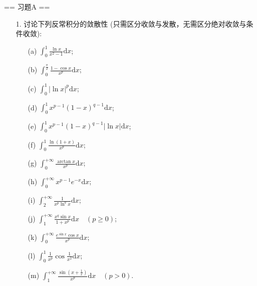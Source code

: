 \newenvironment{solution}{\begin{proofc}[解答]}{\end{proofc}}

== 习题A ==

\begin{enumerate}
    \item[1.]讨论下列反常积分的敛散性 (只需区分收敛与发散，无需区分绝对收敛与条件收敛):
    \begin{enumerate}
        \item[(a)]$\displaystyle \int_{0}^{1}\frac{\ln{x}}{x^2-1}\mathrm{d}x$;
        \item[(b)]$\displaystyle \int_{0}^{\frac{\pi}{2}}\frac{1-\cos{x}}{x^p}\mathrm{d}x$;
        \item[(c)]$\displaystyle \int_{0}^{1}\left|\ln{x}\right|^p\mathrm{d}x$;
        \item[(d)]$\displaystyle \int_{0}^{1}x^{p-1}(1-x)^{q-1}\mathrm{d}x$;
        \item[(e)]$\displaystyle \int_{0}^{1}x^{p-1}(1-x)^{q-1}\left|\ln{x}\right|\mathrm{d}x$;
        \item[(f)]$\displaystyle \int_{0}^{1}\frac{\ln(1+x)}{x^p}\mathrm{d}x$;
        \item[(g)]$\displaystyle \int_{0}^{+\infty}\frac{\arctan{x}}{x^p}\mathrm{d}x$;
        \item[(h)]$\displaystyle \int_{0}^{+\infty}x^{p-1}e^{-x}\mathrm{d}x$;
        \item[(i)]$\displaystyle \int_{2}^{+\infty}\frac{1}{x^p\ln^q{x}}\mathrm{d}x$;
        \item[(j)]$\displaystyle \int_{1}^{+\infty}\frac{x^q\sin{x}}{1+x^p}\mathrm{d}x\quad (p\geq 0)$;
        \item[(k)]$\displaystyle \int_{0}^{+\infty}\frac{e^{\sin{x}}\cos{x}}{x^p}\mathrm{d}x$;
        \item[(l)]$\displaystyle \int_{0}^{1}\frac{1}{x^p}\cos{\frac{1}{x^2}}\mathrm{d}x$;
        \item[(m)]$\displaystyle \int_{1}^{+\infty}\frac{\sin\left(x+\frac{1}{x}\right)}{x^p}\mathrm{d}x\quad (p>0)$.

\end{enumerate}
\end{enumerate}
